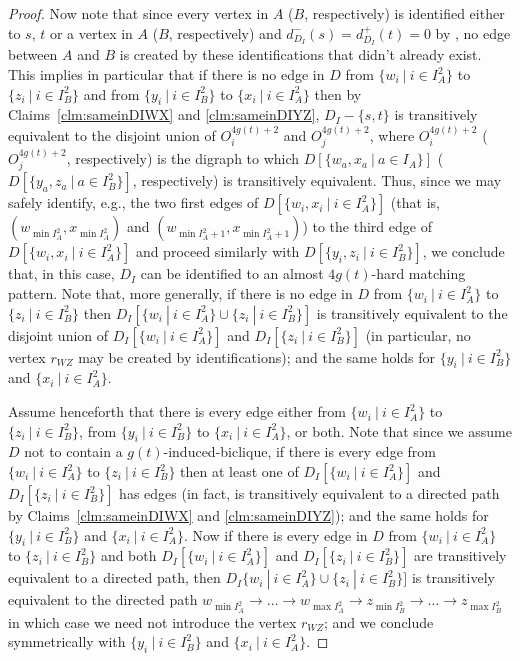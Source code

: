 \begin{proof}
Now note that since every vertex in $A$ ($B$, respectively) is identified either to $s$, $t$ or a vertex in $A$ ($B$, respectively) and $d^-_{D_I}(s) = d^+_{D_I}(t) = 0$ by , 
no edge between $A$ and $B$ is created by these identifications that didn't already exist.
This implies in particular that if there is no edge in $D$ from $\{w_i~|~i \in I_A^2\}$ to $\{z_i~|~i \in I_B^2\}$ 
and from $\{y_i~|~i\in I_B^2\}$ to $\{x_i~|~i \in I_A^2\}$ then by Claims~\ref{clm:sameinDIWX} and \ref{clm:sameinDIYZ}, $D_I - \{s,t\}$ is transitively equivalent to the disjoint union of $O_i^{4g(t)+2}$ and $O_j^{4g(t)+2}$, 
where $O_i^{4g(t)+2}$ ($O_j^{4g(t)+2}$, respectively) is the digraph to which $D[\{w_a,x_a~|~a \in I_A\}]$ ($D[\{y_a,z_a~|~a \in I_B^2\}]$, respectively) is transitively equivalent.
Thus, since we may safely identify, e.g., the two first edges of $D[\{w_i,x_i~|~i \in I_A^2\}]$ 
(that is, $(w_{\min I_A^2},x_{\min I_A^2})$ and $(w_{\min I_A^2+1},x_{\min I_A^2+1})$) to the third edge of
$D[\{w_i,x_i~|~i \in I_A^2\}]$ and proceed similarly with $D[\{y_i,z_i~|~i \in I_B^2\}]$,
we conclude that, in this case, $D_I$ can be identified to an almost $4g(t)$-hard matching pattern.
Note that, more generally, if there is no edge in $D$ from $\{w_i~|~i \in I_A^2\}$ to $\{z_i~|~i \in I_B^2\}$
then $D_I[\{w_i~|~i \in I_A^2\} \cup \{z_i~|~i \in I_B^2\}]$ is transitively equivalent to the disjoint union of $D_I[\{w_i~|~i \in I_A^2\}]$ and $D_I[\{z_i~|~i \in I_B^2\}]$ (in particular, no vertex $r_{WZ}$ may be created by identifications); 
and the same holds for $\{y_i~|~i\in I_B^2\}$ and $\{x_i~|~i \in I_A^2\}$.

Assume henceforth that there is every edge either from $\{w_i~|~i \in I_A^2\}$ to $\{z_i~|~i \in I_B^2\}$,
from $\{y_i~|~i\in I_B^2\}$ to $\{x_i~|~i \in I_A^2\}$, or both.
Note that since we assume $D$ not to contain a $g(t)$-induced-biclique,
if there is every edge from $\{w_i~|~i \in I_A^2\}$ to $\{z_i~|~i \in I_B^2\}$
then at least one of $D_I[\{w_i~|~i \in I_A^2\}]$ and $D_I[\{z_i~|~i \in I_B^2\}]$ has edges 
(in fact, is transitively equivalent to a directed path by Claims~\ref{clm:sameinDIWX} and \ref{clm:sameinDIYZ});
and the same holds for $\{y_i~|~i\in I_B^2\}$ and $\{x_i~|~i \in I_A^2\}$.
Now if there is every edge in $D$ from $\{w_i~|~i \in I_A^2\}$ to $\{z_i~|~i \in I_B^2\}$
and both $D_I[\{w_i~|~i \in I_A^2\}]$ and $D_I[\{z_i~|~i \in I_B^2\}]$ are transitively equivalent to a directed path,
then $D_I\{w_i~|~i \in I_A^2\} \cup \{z_i~|~i \in I_B^2\}]$ is transitively equivalent to the directed path
$w_{\min I_A^2} \rightarrow \ldots \rightarrow w_{\max I_A^2} \rightarrow z_{\min I_B^2} \rightarrow \ldots \rightarrow z_{\max I_B^2}$ in which case we need not introduce the vertex $r_{WZ}$;
and we conclude symmetrically with $\{y_i~|~i\in I_B^2\}$ and $\{x_i~|~i \in I_A^2\}$.
 

\end{proof}
